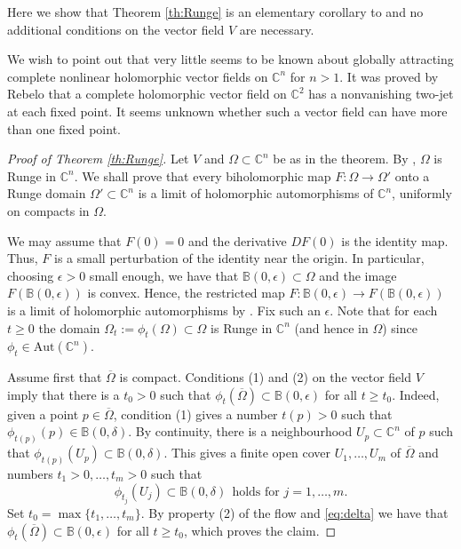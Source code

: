 \documentclass[12pt]{amsart}
\theoremstyle{definition}
\numberwithin{equation}{section}
\numberwithin{figure}{section}
\newcommand\B{\mathbb{B}}
\newcommand\C{\mathbb{C}}
\newcommand\Aut{\mathrm{Aut}}
\numberwithin{equation}{section}
\begin{document}
Here we show that Theorem \ref{th:Runge} is an 
elementary corollary to \cite[Theorem 1.1]{ForstnericRosay1993} 
and no additional conditions on the vector field $V$ are necessary.

We wish to point out that very little seems to be known about 
globally attracting complete nonlinear holomorphic vector fields
on $\C^n$ for $n>1$. 
It was proved by Rebelo \cite{Rebelo1996} that a complete holomorphic 
vector field on $\C^2$ has a nonvanishing two-jet at each fixed point. 
It seems unknown whether such a vector field 
can have more than one fixed point.

\begin{proof}[Proof of Theorem \ref{th:Runge}] 
Let $V$ and $\Omega\subset \C^n$ be as in the theorem.
By \cite[Theorem 1.1]{ChatterjeeGorai2025X}, 
$\Omega$ is Runge in $\C^n$. We shall prove 
that every biholomorphic map $F:\Omega\to \Omega'$ 
onto a Runge domain $\Omega'\subset\C^n$ 
is a limit of holomorphic automorphisms
of $\C^n$, uniformly on compacts in $\Omega$. 

We may assume that $F(0)=0$ and the derivative
$DF(0)$ is the identity map. 
Thus, $F$ is a small perturbation of the identity near the origin.
In particular, choosing $\epsilon >0$ small enough, 
we have that $\B(0,\epsilon)\subset\Omega$ and 
the image $F(\B(0,\epsilon))$ is convex. Hence, the restricted map
$F:\B(0,\epsilon)\to F(\B(0,\epsilon))$ is a limit of  
holomorphic automorphisms by \cite[Theorem 2.1]{AndersenLempert1992}.
Fix such an $\epsilon$. Note that for each $t\ge 0$ the domain 
$\Omega_t:=\phi_t(\Omega)\subset \Omega$
is Runge in $\C^n$ (and hence in $\Omega$) since $\phi_t\in\Aut(\C^n)$. 

Assume first that $\overline \Omega$ is compact.  
Conditions (1) and (2) on the vector field 
$V$ imply that there is a $t_0>0$ such that 
$\phi_{t}(\overline\Omega)\subset \B(0,\epsilon)$ for all $t\ge t_0$.
Indeed, given a point $p\in \overline \Omega$, condition (1) 
gives a number $t(p)>0$ such that $\phi_{t(p)}(p)\in \B(0,\delta)$.
By continuity, there is a neighbourhood $U_p\subset \C^n$
of $p$ such that $\phi_{t(p)}(U_p)\subset \B(0,\delta)$.
This gives a finite open cover $U_1,\ldots,U_m$ of $\overline \Omega$
and numbers $t_1>0,\ldots,t_m>0$ such that 
\begin{equation}\label{eq:delta}
	\phi_{t_j}(U_j)\subset \B(0,\delta)\ \ \text{holds for $j=1,\ldots,m$}.
\end{equation}
Set $t_0=\max\{t_1,\ldots,t_m\}$. By property (2) of the flow 
and \eqref{eq:delta} we have that 
$\phi_t(\overline \Omega)\subset \B(0,\epsilon)$ for all $t\ge t_0$,
which proves the claim.


\end{proof}
\end{document}
